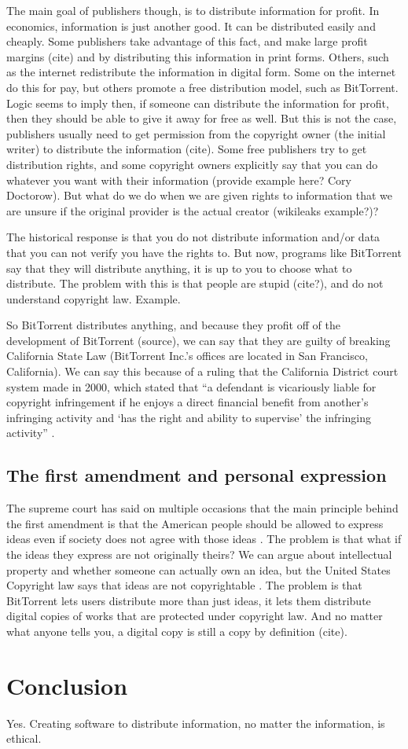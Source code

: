 \documentclass[11pt]{article}
\begin{document}
The main goal of publishers though, is to distribute information for profit. In economics, information is just another good. It can be distributed easily and cheaply. Some publishers take advantage of this fact, and make large profit margins (cite) and by distributing this information in print forms. Others, such as the internet redistribute the information in digital form. Some on the internet do this for pay, but others promote a free distribution model, such as BitTorrent. Logic seems to imply then, if someone can distribute the information for profit, then they should be able to give it away for free as well. But this is not the case, publishers usually need to get permission from the copyright owner (the initial writer) to distribute the information (cite). Some free publishers try to get distribution rights, and some copyright owners explicitly say that you can do whatever you want with their information (provide example here? Cory Doctorow). But what do we do when we are given rights to information that we are unsure if the original provider is the actual creator (wikileaks example?)?

The historical response is that you do not distribute information and/or data that you can not verify you have the rights to. But now, programs like BitTorrent say that they will distribute anything, it is up to you to choose what to distribute. The problem with this is that people are stupid (cite?), and do not understand copyright law. Example.

So BitTorrent distributes anything, and because they profit off of the development of BitTorrent (source), we can say that they are guilty of breaking California State Law (BitTorrent Inc.'s offices are located in San Francisco, California). We can say this because of a ruling that the California District court system made in 2000, which stated that ``a defendant is vicariously liable for copyright infringement if he enjoys a direct financial benefit from another's infringing activity and `has the right and ability to supervise' the infringing activity'' \cite{2000m}.

\subsection{The first amendment and personal expression}

The supreme court has said on multiple occasions that the main principle behind the first amendment is that the American people should be allowed to express ideas even if society does not agree with those ideas \cite[51]{1988hustler}. The problem is that what if the ideas they express are not originally theirs? We can argue about intellectual property and whether someone can actually own an idea, but the United States Copyright law says that ideas are not copyrightable \cite{t17c1s103}. The problem is that BitTorrent lets users distribute more than just ideas, it lets them distribute digital copies of works that are protected under copyright law. And no matter what anyone tells you, a digital copy is still a copy by definition (cite).

\section{Conclusion}
Yes. Creating software to distribute information, no matter the information, is ethical.

\newpage


\end{document}
